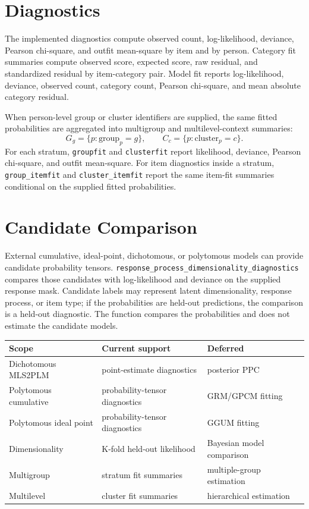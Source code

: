 \documentclass[11pt]{article}
\begin{document}
\section{Diagnostics}

The implemented diagnostics compute observed count, log-likelihood, deviance,
Pearson chi-square, and outfit mean-square by item and by person. Category fit
summaries compute observed score, expected score, raw residual, and standardized
residual by item-category pair. Model fit reports log-likelihood, deviance,
observed count, category count, Pearson chi-square, and mean absolute category
residual.

When person-level group or cluster identifiers are supplied, the same fitted
probabilities are aggregated into multigroup and multilevel-context summaries:
\[
  G_g = \{p: \mathrm{group}_p=g\}, \qquad
  C_c = \{p: \mathrm{cluster}_p=c\}.
\]
For each stratum, \texttt{groupfit} and \texttt{clusterfit} report likelihood,
deviance, Pearson chi-square, and outfit mean-square. For item diagnostics
inside a stratum, \texttt{group\_itemfit} and \texttt{cluster\_itemfit} report
the same item-fit summaries conditional on the supplied fitted probabilities.

\section{Candidate Comparison}

External cumulative, ideal-point, dichotomous, or polytomous models can provide
candidate probability tensors. \texttt{response\_process\_dimensionality\_diagnostics}
compares those candidates with log-likelihood and deviance on the supplied
response mask. Candidate labels may represent latent dimensionality, response
process, or item type; if the probabilities are held-out predictions, the
comparison is a held-out diagnostic. The function compares the probabilities
and does not estimate the candidate models.

\begin{table}[h]
\centering
\begin{tabular}{lll}
\toprule
Scope & Current support & Deferred \\
\midrule
Dichotomous MLS2PLM & point-estimate diagnostics & posterior PPC \\
Polytomous cumulative & probability-tensor diagnostics & GRM/GPCM fitting \\
Polytomous ideal point & probability-tensor diagnostics & GGUM fitting \\
Dimensionality & K-fold held-out likelihood & Bayesian model comparison \\
Multigroup & stratum fit summaries & multiple-group estimation \\
Multilevel & cluster fit summaries & hierarchical estimation \\
\bottomrule
\end{tabular}
\end{table}
\end{document}
